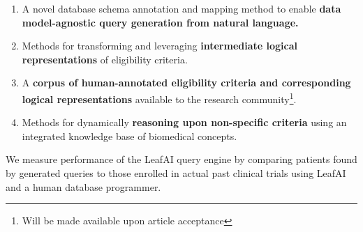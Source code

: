 \documentclass[../main.tex]{subfiles}
\begin{document}
\begin{enumerate}
    \item{A novel database schema annotation and mapping method to enable \textbf{data model-agnostic query generation from natural language.}}
    \item{Methods for transforming and leveraging \textbf{intermediate logical representations} of eligibility criteria.}
    \item{A \textbf{corpus of human-annotated eligibility criteria and corresponding logical representations} available to the research community\footnote{Will be made available upon article acceptance}.}
    \item{Methods for dynamically \textbf{reasoning upon non-specific criteria} using an integrated knowledge base of biomedical concepts.}
\end{enumerate}

\noindent We measure performance of the LeafAI query engine by comparing patients found by generated queries to those enrolled in actual past clinical trials using LeafAI and a human database programmer.
\end{document}
